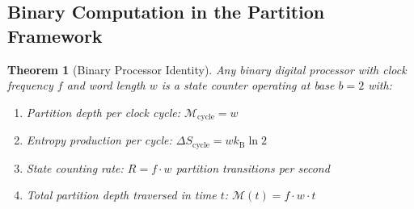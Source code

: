 \documentclass[twocolumn,10pt]{article}
\newtheorem{theorem}{Theorem}[section]
\theoremstyle{remark}
\newcommand{\kB}{k_{\mathrm{B}}}
\newcommand{\Depth}{\mathcal{M}}
\begin{document}
\subsection{Binary Computation in the Partition Framework}

\begin{theorem}[Binary Processor Identity]
\label{thm:binary_identity}
Any binary digital processor with clock frequency $f$ and word length $w$ is a state counter operating at base $b = 2$ with:
\begin{enumerate}
    \item Partition depth per clock cycle: $\Depth_{\text{cycle}} = w$
    \item Entropy production per cycle: $\Delta S_{\text{cycle}} = w \kB \ln 2$
    \item State counting rate: $R = f \cdot w$ partition transitions per second
    \item Total partition depth traversed in time $t$: $\Depth(t) = f \cdot w \cdot t$
\end{enumerate}
\end{theorem}
\end{document}
